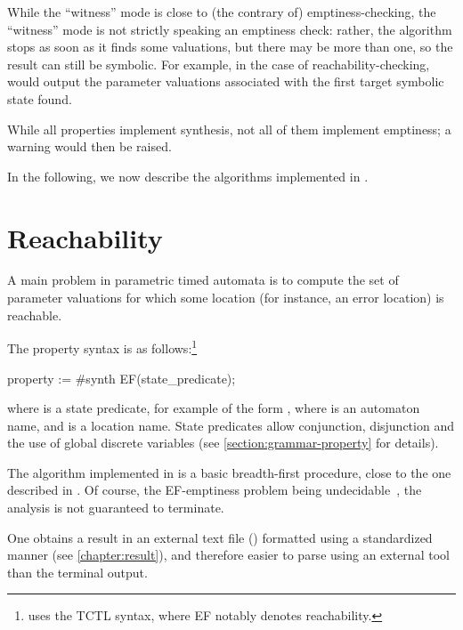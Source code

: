 While the ``witness'' mode is close to (the contrary of) emptiness-checking, the ``witness'' mode is not strictly speaking an emptiness check: rather, the algorithm stops as soon as it finds some valuations, but there may be more than one, so the result can still be symbolic.
For example, in the case of reachability-checking, \imitator{} would output the parameter valuations associated with the first target symbolic state found.


While all properties implement synthesis, not all of them implement emptiness; a warning would then be raised.

In the following, we now describe the algorithms implemented in \imitator{}.

\section{Reachability}\label{ss:mode:EFsynth}

A main problem in parametric timed automata is to compute the set of parameter valuations for which some location (for instance, an error location) is reachable.

The property syntax is as follows:\footnote{%
	\imitator{} uses the TCTL syntax, where EF notably denotes reachability.
}

\begin{IMITATORproperty}
property := #synth EF(state_predicate);
\end{IMITATORproperty}


\noindent{}where  is a state predicate, for example of the form , where  is an automaton name, and  is a location name.
State predicates allow conjunction, disjunction and the use of global discrete variables (see \cref{section:grammar-property} for details).



The algorithm \EFsynth{} implemented in \imitator{} is a basic breadth-first procedure, close to the one described in \cite{JLR15}.
Of course, the EF-emptiness problem being undecidable~\cite{AHV93}, the analysis is not guaranteed to terminate.

One obtains a result in an external text file () formatted using a standardized manner (see \cref{chapter:result}), and therefore easier to parse using an external tool than the terminal output.

